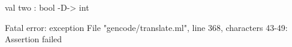\chklistingfalse
{}
\begin{ChkListingMsg}
val two : bool -D-> int 
\end{ChkListingMsg}
\begin{ChkListingErr}
Fatal error: exception File "gencode/translate.ml", line 368, characters 43-49: Assertion failed
\end{ChkListingErr}
